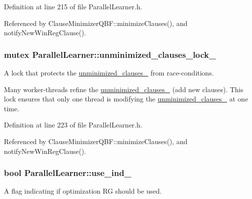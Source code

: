 Definition at line 215 of file Parallel\-Learner.\-h.



Referenced by Clause\-Minimizer\-Q\-B\-F\-::minimize\-Clauses(), and notify\-New\-Win\-Reg\-Clause().

\hypertarget{classParallelLearner_aa16d364d9fdd0c2fe5180ee1b023a4ec}{
\subsubsection[{unminimized\-\_\-clauses\-\_\-lock\-\_\-}]{\setlength{\rightskip}{0pt plus 5cm}mutex Parallel\-Learner\-::unminimized\-\_\-clauses\-\_\-lock\-\_\-}}\label{classParallelLearner_aa16d364d9fdd0c2fe5180ee1b023a4ec}


A lock that protects the \hyperlink{classParallelLearner_aba6b363071d9a39d7b368cec5b629c25}{unminimized\-\_\-clauses\-\_\-} from race-\/conditions. 

Many worker-\/threads refine the \hyperlink{classParallelLearner_aba6b363071d9a39d7b368cec5b629c25}{unminimized\-\_\-clauses\-\_\-} (add new clauses). This lock ensures that only one thread is modifying the \hyperlink{classParallelLearner_aba6b363071d9a39d7b368cec5b629c25}{unminimized\-\_\-clauses\-\_\-} at one time. 

Definition at line 223 of file Parallel\-Learner.\-h.



Referenced by Clause\-Minimizer\-Q\-B\-F\-::minimize\-Clauses(), and notify\-New\-Win\-Reg\-Clause().

\hypertarget{classParallelLearner_aebaf891aada574da650732795f041dbe}{
\subsubsection[{use\-\_\-ind\-\_\-}]{\setlength{\rightskip}{0pt plus 5cm}bool Parallel\-Learner\-::use\-\_\-ind\-\_\-\hspace{0.3cm}{\ttfamily [protected]}}}\label{classParallelLearner_aebaf891aada574da650732795f041dbe}


A flag indicating if optimization R\-G should be used. 

